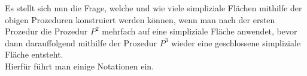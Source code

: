 \documentclass[12pt,titlepage]{article}
\begin{document}
Es stellt sich nun die Frage, welche und wie viele simpliziale Flächen mithilfe der obigen Prozeduren konstruiert werden können, wenn man nach der ersten Prozedur die Prozedur $P^2$ mehrfach auf eine simpliziale Fläche anwendet, bevor dann darauffolgend mithilfe der Prozedur $P^3$ wieder eine geschlossene simpliziale Fläche entsteht.\\
Hierfür führt man einige Notationen ein.

\begin{comment}
\begin{definition}
Sei $(X,<)$ eine geschlossene simpliziale Fläche und $F \in X_2$. \\
Falls $X$ eine geschlossene simpliziale Fläche ist, dann definiert man \emph{$H_F(X)$} als
\[
H_F(X):=\{f \in (P^1_F(X))_1\mid \vert X_{0}(f) \cap X_{0}(F)\vert = 1 \land X_2(f) \cap X_2(X_1(F))\neq \emptyset .
\]
Falls $X$ durch Anwenden einer der ersten beiden P
\end{definition}
\end{comment}
\end{document}
